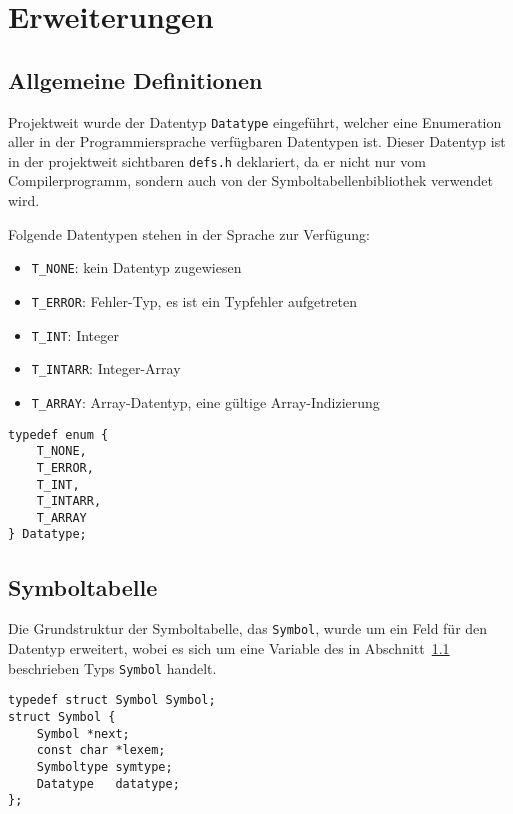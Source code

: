 \chapter{Erweiterungen}

\section{Allgemeine Definitionen}
\label{sec:gendef}

Projektweit wurde der Datentyp \texttt{Datatype} eingeführt,
welcher eine Enumeration aller in der Programmiersprache verfügbaren Datentypen ist.
Dieser Datentyp ist in der projektweit sichtbaren \texttt{defs.h} deklariert,
da er nicht nur vom Compilerprogramm,
sondern auch von der Symboltabellenbibliothek verwendet wird.

Folgende Datentypen stehen in der Sprache zur Verfügung:
\begin{itemize}
\item \texttt{T\_NONE}: kein Datentyp zugewiesen
\item \texttt{T\_ERROR}: Fehler-Typ, es ist ein Typfehler aufgetreten
\item \texttt{T\_INT}: Integer
\item \texttt{T\_INTARR}: Integer-Array
\item \texttt{T\_ARRAY}: Array-Datentyp, eine gültige Array-Indizierung
\end{itemize}

\begin{lstlisting}
typedef enum {
	T_NONE,
	T_ERROR,
	T_INT,
	T_INTARR,
	T_ARRAY
} Datatype;
\end{lstlisting}

\section{Symboltabelle}

Die Grundstruktur der Symboltabelle, das \texttt{Symbol},
wurde um ein Feld für den Datentyp erweitert,
wobei es sich um eine Variable des in Abschnitt~\ref{sec:gendef} beschrieben Typs \texttt{Symbol} handelt.

\begin{lstlisting}
typedef struct Symbol Symbol;
struct Symbol {
	Symbol *next;
	const char *lexem;
	Symboltype symtype;
	Datatype   datatype;
};
\end{lstlisting}
